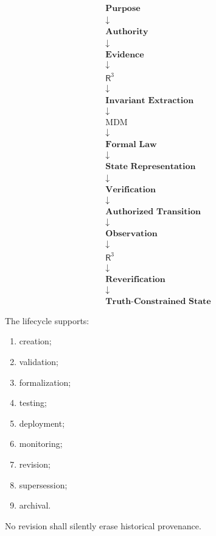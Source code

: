 \documentclass[11pt]{article}
\newcommand{\Rthree}{\ensuremath{\mathsf{R}^{3}}}
\newcommand{\MDM}{\ensuremath{\mathrm{MDM}}}
\begin{document}
\[
\boxed{
\begin{array}{c}
\textbf{Purpose}\\
\downarrow\\
\textbf{Authority}\\
\downarrow\\
\textbf{Evidence}\\
\downarrow\\
\Rthree{}\\
\downarrow\\
\textbf{Invariant Extraction}\\
\downarrow\\
\MDM\\
\downarrow\\
\textbf{Formal Law}\\
\downarrow\\
\textbf{State Representation}\\
\downarrow\\
\textbf{Verification}\\
\downarrow\\
\textbf{Authorized Transition}\\
\downarrow\\
\textbf{Observation}\\
\downarrow\\
\Rthree{}\\
\downarrow\\
\textbf{Reverification}\\
\downarrow\\
\textbf{Truth-Constrained State}
\end{array}
}
\]

The lifecycle supports:

\begin{enumerate}
    \item creation;
    \item validation;
    \item formalization;
    \item testing;
    \item deployment;
    \item monitoring;
    \item revision;
    \item supersession;
    \item archival.
\end{enumerate}

No revision shall silently erase historical provenance.

\end{document}
